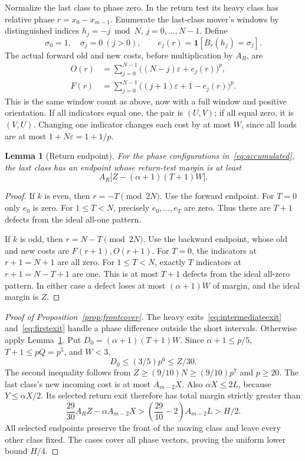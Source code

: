 \documentclass[11pt]{article}
\newtheorem{lemma}[theorem]{Lemma}
\theoremstyle{definition}
\theoremstyle{remark}
\newcommand{\ind}{\mathbf 1}
\begin{document}
Normalize the last class to phase zero. In the return test its heavy class has relative phase $r=x_0-x_{m-1}$. Enumerate the last-class mover's windows by distinguished indices $h_j=-j\bmod N$, $j=0,\ldots,N-1$. Define
\[
 \sigma_0=1,\quad \sigma_j=0\ (j>0),\qquad
 e_j(r)=\ind[B_r(h_j)=\sigma_j].
\]
The actual forward old and new costs, before multiplication by $A_R$, are
\begin{align}
 O(r)&=\sum_{j=0}^{N-1}\big((N-j)\varepsilon+e_j(r)\big)^p,\label{eq:returnold}\\
 F(r)&=\sum_{j=0}^{N-1}\big((j+1)\varepsilon+1-e_j(r)\big)^p.\label{eq:returnnew}
\end{align}
This is the same window count as above, now with a full window and positive orientation. If all indicators equal one, the pair is $(U,V)$; if all equal zero, it is $(V,U)$. Changing one indicator changes each cost by at most $W$, since all loads are at most $1+N\varepsilon=1+1/p$.

\begin{lemma}[Return endpoint]\label{lem:return}
For the phase configurations in~\eqref{eq:accumulated}, the last class has an endpoint whose return-test margin is at least
\[
 A_R\big[Z-(\alpha+1)(T+1)W\big].
\]
\end{lemma}
\begin{proof}
If $k$ is even, then $r=-T\pmod{2N}$. Use the forward endpoint. For $T=0$ only $e_0$ is zero. For $1\le T<N$, precisely $e_0,\ldots,e_T$ are zero. Thus there are $T+1$ defects from the ideal all-one pattern.

If $k$ is odd, then $r=N-T\pmod{2N}$. Use the backward endpoint, whose old and new costs are $F(r+1),O(r+1)$. For $T=0$, the indicators at $r+1=N+1$ are all zero. For $1\le T<N$, exactly $T$ indicators at $r+1=N-T+1$ are one. This is at most $T+1$ defects from the ideal all-zero pattern. In either case a defect loses at most $(\alpha+1)W$ of margin, and the ideal margin is $Z$.
\end{proof}

\begin{proof}[Proof of Proposition~\ref{prop:frontcover}]
The heavy exits~\eqref{eq:intermediateexit} and~\eqref{eq:firstexit} handle a phase difference outside the short intervals. Otherwise apply Lemma~\ref{lem:return}. Put $D_0=(\alpha+1)(T+1)W$. Since $\alpha+1\le p/5$, $T+1\le pQ=p^5$, and $W<3$,
\[
 D_0\le(3/5)p^6\le Z/30.
\]
The second inequality follows from $Z\ge(9/10)N\ge(9/10)p^7$ and $p\ge20$. The last class's new incoming cost is at most $A_{m-2}X$. Also $\alpha X\le2L$, because $Y\le\alpha X/2$. Its selected return exit therefore has total margin strictly greater than
\[
 \frac{29}{30}A_RZ-\alpha A_{m-2}X
 >\left(\frac{29}{10}-2\right)A_{m-2}L>H/2.
\]
All selected endpoints preserve the front of the moving class and leave every other class fixed. The cases cover all phase vectors, proving the uniform lower bound $H/4$.
\end{proof}
\end{document}
